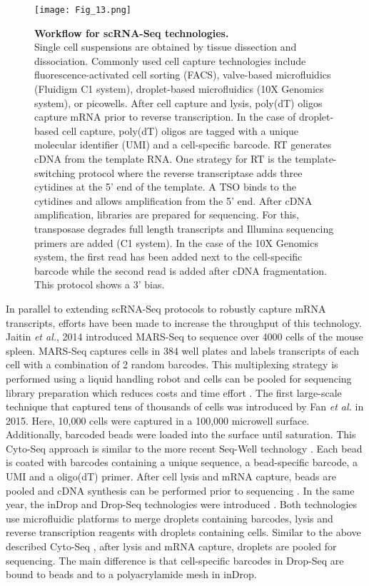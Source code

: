 \begin{figure}[!h]
\centering
\texttt{[image: Fig\_13.png]}
\caption[Workflow for scRNA-Seq technologies]{\textbf{Workflow for scRNA-Seq technologies.}\\
Single cell suspensions are obtained by tissue dissection and dissociation. 
Commonly used cell capture technologies include fluorescence-activated cell sorting (FACS), valve-based microfluidics (Fluidigm\textsuperscript{\textregistered{}} C1 system), droplet-based microfluidics (10X Genomics\textsuperscript{\textregistered{}} system), or picowells. 
After cell capture and lysis, poly(dT) oligos capture mRNA prior to reverse transcription. 
In the case of droplet-based cell capture, poly(dT) oligos are tagged with a unique molecular identifier (UMI) and a cell-specific barcode. 
\Gls{RT} generates cDNA from the template RNA. One strategy for RT is the template-switching protocol where the reverse transcriptase adds three cytidines at the 5' end of the template. 
A \gls{TSO} binds to the cytidines and allows amplification from the 5' end. 
After cDNA amplification, libraries are prepared for sequencing. For this, transposase degrades full length transcripts and Illumina sequencing primers are added (C1 system). 
In the case of the 10X Genomics system, the first read has been added next to the cell-specific barcode while the second read is added after cDNA fragmentation. This protocol shows a 3' bias.}
\label{fig0:scRNA-Seq}
\end{figure}

In parallel to extending scRNA-Seq protocols to robustly capture mRNA transcripts, efforts have been made to increase the throughput of this technology. 
Jaitin \emph{et al.}, 2014 introduced \gls{MARS-Seq} to sequence over 4000 cells of the mouse spleen. 
MARS-Seq captures cells in 384 well plates and labels transcripts of each cell with a combination of 2 random barcodes. 
This multiplexing strategy is performed using a liquid handling robot and cells can be pooled for sequencing library preparation which reduces costs and time effort \citep{Jaitin2014}. 
The first large-scale technique that captured tens of thousands of cells was introduced by Fan \emph{et al.} in 2015. 
Here, 10,000 cells were captured in a 100,000 microwell surface. 
Additionally, barcoded beads were loaded into the surface until saturation. 
This Cyto-Seq approach is similar to the more recent Seq-Well technology \citep{Gierahn2017}. 
Each bead is coated with barcodes containing a unique sequence, a bead-specific barcode, a UMI and a oligo(dT) primer. After cell lysis and mRNA capture, beads are pooled and cDNA synthesis can be performed prior to sequencing \citep{Fan2015}. 
In the same year, the inDrop and Drop-Seq technologies were introduced \citep{Klein2015, Macosko2015}. 
Both technologies use microfluidic platforms to merge droplets containing barcodes, lysis and reverse transcription reagents with droplets containing cells. 
Similar to the above described Cyto-Seq \citep{Fan2015}, after lysis and mRNA capture, droplets are pooled for sequencing. 
The main difference is that cell-specific barcodes in Drop-Seq are bound to beads and to a polyacrylamide mesh in inDrop.  \\

